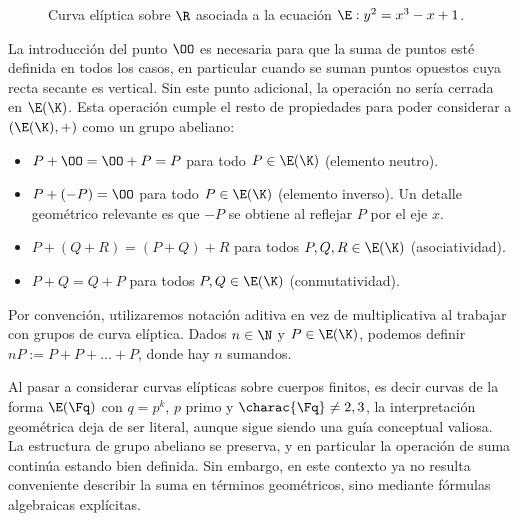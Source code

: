 \begin{figure}[ht]
	\centering
	\caption{Curva elíptica sobre $\R$ asociada a la ecuación $\E: y^2 = x^3 - x + 1$.}
	\label{fig:curva-eliptica-real}
\end{figure}


La introducción del punto $\OO$ es necesaria para que la suma de puntos esté definida en todos los casos, en particular cuando se suman puntos opuestos cuya recta secante es vertical. Sin este punto adicional, la operación no sería cerrada en $\E(\K)$. Esta operación cumple el resto de propiedades para poder considerar a $(\E(\K), +)$ como un grupo abeliano:
\begin{itemize}
	\item $P + \OO = \OO + P = P$ para todo $P \in \E(\K)$ (elemento neutro).
	\item $P + (-P) = \OO$ para todo $P \in \E(\K)$ (elemento inverso). Un detalle geométrico relevante es que $-P$ se obtiene al reflejar $P$ por el eje $x$.
	\item $P + (Q + R) = (P + Q) + R$ para todos $P, Q, R \in \E(\K)$ (asociatividad).
	\item $P + Q = Q + P$ para todos $P, Q \in \E(\K)$ (conmutatividad).
\end{itemize}

Por convención, utilizaremos notación aditiva en vez de multiplicativa al trabajar con grupos de curva elíptica. Dados $n \in \N$ y $P \in \E(\K)$, podemos definir $nP := P + P + \ldots + P$, donde hay $n$ sumandos.

Al pasar a considerar curvas elípticas sobre cuerpos finitos, es decir curvas de la forma $\E(\Fq)$ con $q = p^k$, $p$ primo y $\charac{\Fq} \neq 2,3$, la interpretación geométrica deja de ser literal, aunque sigue siendo una guía conceptual valiosa. La estructura de grupo abeliano se preserva, y en particular la operación de suma continúa estando bien definida. Sin embargo, en este contexto ya no resulta conveniente describir la suma en términos geométricos, sino mediante fórmulas algebraicas explícitas.


